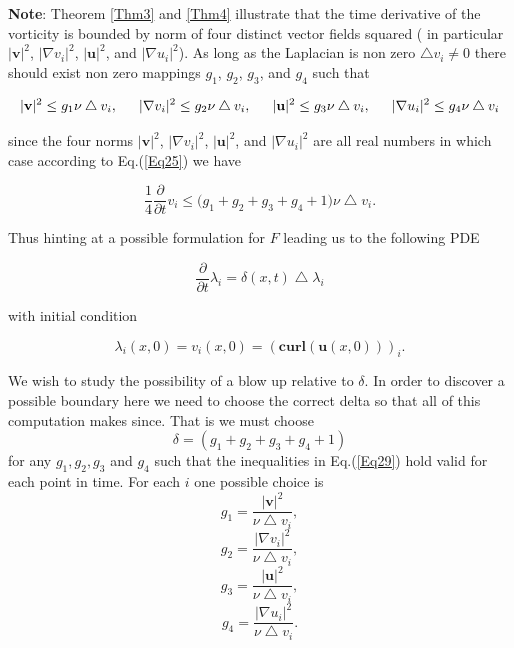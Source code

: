 \documentclass[amsmath,12pt,a4paper]{amsart}
\begin{document}
\textbf{Note}: Theorem \ref{Thm3} and \ref{Thm4} illustrate that the time derivative of the vorticity is bounded by norm of four distinct vector fields squared ( in particular $|\textbf{v}|^2$, $|\nabla v_i |^2$, $|\textbf{u}|^2$, and $|\nabla u_i|^2$). As long as the Laplacian is non zero $\bigtriangleup v_i \neq 0$ there should exist non zero mappings $g_1$, $g_2$, $g_3$, and $g_4$ such that 

\begin{equation}\label{Eq29}
\begin{split}
 |\textbf{v}|^2\le g_1 \nu \bigtriangleup v_i, \indent  |\nabla v_i |^2\le g_2 \nu \bigtriangleup v_i,\indent  |\textbf{u}|^2\le g_3 \nu \bigtriangleup v_i, \indent  |\nabla u_i|^2\le g_4 \nu \bigtriangleup v_i
\end{split}
\end{equation}

since the four norms $|\textbf{v}|^2$, $|\nabla v_i |^2$, $|\textbf{u}|^2$, and $|\nabla u_i|^2$  are all real numbers in which case according to Eq.(\ref{Eq25}) we have

\begin{equation}\label{Eq30}
\dfrac{1}{4}\dfrac{\partial}{\partial t} v_i\le \biggl(g_1+g_2+g_3+g_4+1\biggr)\nu \bigtriangleup v_i.
\end{equation}

Thus hinting at a possible formulation for $F$ leading us to the following PDE 


\begin{equation}\label{Eq31}
\dfrac{\partial}{\partial t} \lambda_i= \delta(x,t) \bigtriangleup \lambda_i
\end{equation}

with initial condition 

$$\lambda_i(x,0) = v_i(x,0) = (\textbf{curl}(\textbf{u}(x,0)))_i.$$


We wish to study the possibility of a blow up relative to $\delta$. In order to discover a possible boundary here we need to choose the correct delta so that all of this computation makes since. That is we must choose $$\delta = (g_1 +g_2 +g_3+g_4 +1)$$ for any $g_1,g_2,g_3$ and $g_4$ such that the inequalities in Eq.(\ref{Eq29}) hold valid for each point in time. For each $i$ one possible choice is $$g_1 = \dfrac{|\textbf{v}|^2}{\nu \bigtriangleup v_i},$$ $$ g_2 = \dfrac{|\nabla v_i|^2}{\nu \bigtriangleup v_i},$$   $$ g_3 = \dfrac{|\textbf{u}|^2}{\nu \bigtriangleup v_i},$$  $$ g_4 = \dfrac{|\nabla u_i|^2}{\nu \bigtriangleup v_i}.$$
\end{document}
